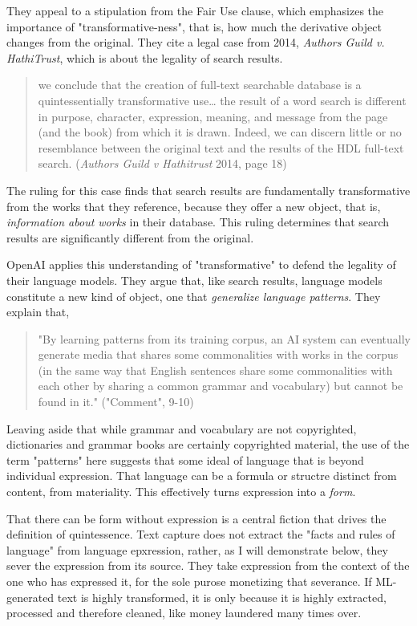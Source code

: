 \documentclass[11pt]{article}
\begin{document}
\begin{enumerate}
They appeal to a stipulation from the Fair Use clause, which
emphasizes the importance of "transformative-ness", that is, how much
the derivative object changes from the original. They cite a legal
case from 2014, \emph{Authors Guild v. HathiTrust}, which is about the
legality of search results.
\begin{quote}
we conclude that the creation of full-text searchable database is a
quintessentially transformative use\ldots{} the result of a word search is
different in purpose, character, expression, meaning, and message from
the page (and the book) from which it is drawn. Indeed, we can discern
little or no resemblance between the original text and the results of
the HDL full-text search. (\emph{Authors Guild v Hathitrust} 2014, page 18)
\end{quote}
The ruling for this case finds that search results are fundamentally
transformative from the works that they reference, because they offer
a new object, that is, \emph{information about works} in their database.
This ruling determines that search results are significantly different
from the original.

OpenAI applies this understanding of "transformative" to defend the
legality of their language models. They argue that, like search
results, language models constitute a new kind of object, one that
\emph{generalize language patterns}. They explain that,
\begin{quote}
"By learning patterns from its training corpus, an AI system can
eventually generate media that shares some commonalities with works in
the corpus (in the same way that English sentences share some
commonalities with each other by sharing a common grammar and
vocabulary) but cannot be found in it." ("Comment", 9-10)
\end{quote}
Leaving aside that while grammar and vocabulary are not copyrighted,
dictionaries and grammar books are certainly copyrighted material, the
use of the term "patterns" here suggests that some ideal of language
that is beyond individual expression. That language can be a formula
or structre distinct from content, from materiality. This effectively
turns expression into a \emph{form}.

That there can be form without expression is a central fiction that
drives the definition of quintessence. Text capture does not extract
the "facts and rules of language" from language epxression, rather, as
I will demonstrate below, they sever the expression from its source.
They take expression from the context of the one who has expressed it,
for the sole purose monetizing that severance. If ML-generated text is
highly transformed, it is only because it is highly extracted,
processed and therefore cleaned, like money laundered many times over.
\end{enumerate}
\end{document}
